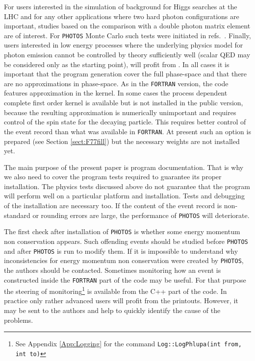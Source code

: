 \documentclass[]{Photos_interface_design}
\begin{document}
For users interested in the simulation of
background for Higgs searches at the LHC and for any other applications where 
two hard photon configurations are important, studies based on the comparison with 
a double photon matrix element are of 
interest. For {\tt PHOTOS} Monte Carlo such tests were initiated 
in refs.~\cite{Barberio:1993qi,RichterWas:1994ep,RichterWas:1993ta}.
Finally, users interested in low energy processes where the underlying physics model 
for photon emission cannot be controlled by theory sufficiently well
(scalar QED may 
be considered only as the starting point), will profit 
from \cite{Nanava:2009vg,Nanava:2006vv}. In all cases it is important that
the  program generation cover the full phase-space and that there are no 
approximations in phase-space. As in the {\tt FORTRAN} version, the code 
features approximation in the kernel. In some cases the process dependent 
complete first order 
kernel is available but is not installed in the public version,  
because the resulting approximation is 
numerically unimportant and requires control of the spin state for the decaying 
particle. This requires better control of the event record than what was available 
in {\tt FORTRAN}. At present such an option is prepared (see Section \ref{sect:F77fill}) but the necessary weights are not installed yet. 

The main purpose of the present paper is program documentation. That is why
we also need to cover the program tests required to guarantee its proper installation.
The physics tests discussed above 
do not guarantee that the program will perform well on a particular platform and installation. Tests and debugging of the installation
are necessary too.  If the content of the event record is non-standard or rounding errors are large, the performance of {\tt PHOTOS} will deteriorate.


The first check after installation of {\tt PHOTOS} is whether some energy momentum non 
conservation appears. Such offending events should be studied
before {\tt PHOTOS}  and after {\tt PHOTOS} is run to modify them.
If it is impossible to understand why inconsistencies for energy momentum non 
conservation were created by {\tt PHOTOS}, the authors should be contacted. Sometimes
monitoring how an event is constructed inside the {\tt FORTRAN} part of the code
may be useful. For that purpose the steering of monitoring\footnote{See Appendix \ref{App:Logging}
for the command {\tt Log::LogPhlupa(int from, int to)}}
 is
available from the C++ part of the code. In practice only rather
 advanced users will profit from the printouts. However, it may be sent to
the authors and help to quickly identify the cause of the problems.
\end{document}
